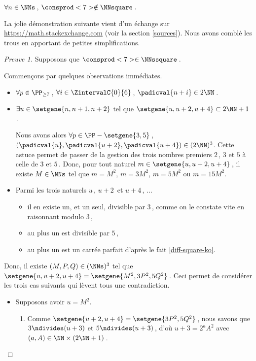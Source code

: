 \begin{fact} \label{case-7}
	 $\forall n \in \NNs$\,, $\consprod<7> \notin \NNsquare$\,.
\end{fact}




La jolie démonstration suivante vient d'un échange sur \url{https://math.stackexchange.com} (voir la section \ref{sources}). Nous avons comblé les trous en apportant de petites simplifications.
	

\begin{proof}[Preuve 1]
	Supposons que $\consprod<7> \in \NNssquare$\,.
	
	\smallskip
	
	Commençons par quelques observations immédiates.
    \begin{itemize}
    	\item  
		$\forall p \in \PP_{\geq 7}$\,, 
   		$\forall i \in \ZintervalC{0}{6}$\,, 
    	$\padicval{n + i} \in 2 \NN$\,.
	
	
		\item $\exists u \in \setgene{n, n+1, n+2}$ tel que $\setgene{u, u + 2, u + 4} \subset 2 \NN + 1$\,.
		
		\noindent
		Nous avons alors
		$\forall p \in \PP - \setgene{3, 5}$\,, 
   		$(\padicval{u}, \padicval{u+2}, \padicval{u+4}) \in ( 2 \NN )^3$.
		Cette astuce permet de passer de la gestion des trois nombres premiers $2$\,, $3$ et $5$ à celle de $3$ et $5$\,.
		Donc, pour tout naturel $m \in \setgene{u, u + 2, u + 4}$\,, 
		il existe $M \in \NNs$ tel que 
		$m = M^2$, $m = 3 M^2$, $m = 5 M^2$ ou $m = 15 M^2$.
	
	
		\item Parmi les trois naturels $u$\,, $u + 2$\, et $u + 4$\,, ...
		\begin{itemize}
    		\item il en existe un, et un seul, divisible par $3$\,, comme on le constate vite en raisonnant modulo $3$\,,

    		\item au plus un est divisible par $5$\,,

    		\item au plus un est un carrée parfait d'après le fait \ref{diff-square-ko}.
		\end{itemize}
    \end{itemize}

    \smallskip
	
	Donc, il existe $(M, P, Q) \in ( \NNs )^3$ tel que 
    $\setgene{u, u + 2, u + 4} = \setgene{M^2, 3P^2, 5Q^2}$\,.
    Ceci permet de considérer les trois cas suivants qui lèvent tous une contradiction.
    \begin{itemize}
    	\item Supposons avoir $u = M^2$.
		\begin{enumerate}
			\item Comme $\setgene{u + 2, u + 4} = \setgene{3P^2, 5Q^2}$\,, nous savons que $3 \ndivides (u + 3)$ et $5 \ndivides (u + 3)$\,, d'où $u + 3 = 2^a A^2$ avec $(a, A) \in \NN \times (2\NN + 1)$\,.


\end{enumerate}
\end{itemize}
\end{proof}
